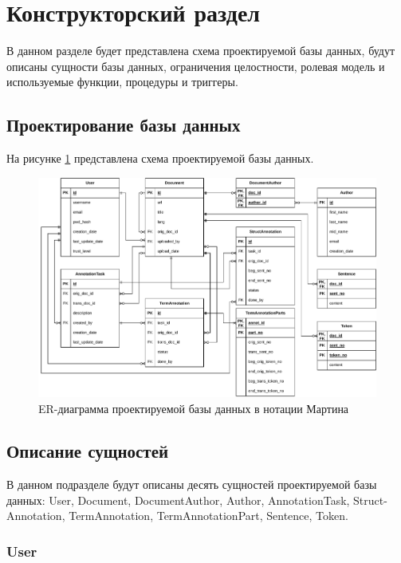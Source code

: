 \section{Конструкторский раздел}

В данном разделе будет представлена схема проектируемой базы данных, будут описаны сущности базы данных, ограничения целостности, ролевая модель и используемые функции, процедуры и триггеры.

\subsection{Проектирование базы данных}

На рисунке \ref{fig:erd} представлена схема проектируемой базы данных.

\begin{figure}[H]
	\centering
	\includegraphics[width=\textwidth]{diag/erd-v3.pdf}
	\caption{ER-диаграмма проектируемой базы данных в нотации Мартина}
	\label{fig:erd}
\end{figure}

\subsection{Описание сущностей}

В данном подразделе будут описаны десять сущностей проектируемой базы данных: User, Document, DocumentAuthor, Author, AnnotationTask, Struct-Annotation, TermAnnotation, TermAnnotationPart, Sentence, Token.

\subsubsection*{User}

